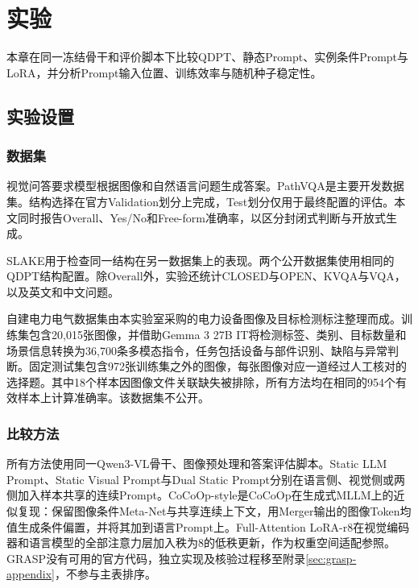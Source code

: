 \section{实验}

本章在同一冻结骨干和评价脚本下比较QDPT、静态Prompt、实例条件Prompt与LoRA，并分析Prompt输入位置、训练效率与随机种子稳定性。

\subsection{实验设置}

\subsubsection{数据集}

视觉问答要求模型根据图像和自然语言问题生成答案\cite{Agrawal2015VQAVQ}。PathVQA\cite{He2020PathVQA3Q}是主要开发数据集。结构选择在官方Validation划分上完成，Test划分仅用于最终配置的评估。本文同时报告Overall、Yes/No和Free-form准确率，以区分封闭式判断与开放式生成。

SLAKE\cite{Liu2021SlakeAS}用于检查同一结构在另一数据集上的表现。两个公开数据集使用相同的QDPT结构配置。除Overall外，实验还统计CLOSED与OPEN、KVQA与VQA，以及英文和中文问题。

自建电力电气数据集由本实验室采购的电力设备图像及目标检测标注整理而成。训练集包含20,015张图像，并借助Gemma 3 27B IT将检测标签、类别、目标数量和场景信息转换为36,700条多模态指令，任务包括设备与部件识别、缺陷与异常判断。固定测试集包含972张训练集之外的图像，每张图像对应一道经过人工核对的选择题。其中18个样本因图像文件关联缺失被排除，所有方法均在相同的954个有效样本上计算准确率。该数据集不公开。

\subsubsection{比较方法}

所有方法使用同一Qwen3-VL骨干\cite{Bai2025Qwen3VLTR}、图像预处理和答案评估脚本。Static LLM Prompt、Static Visual Prompt与Dual Static Prompt分别在语言侧、视觉侧或两侧加入样本共享的连续Prompt\cite{lester2021power,jia2022visual}。CoCoOp-style是CoCoOp\cite{Zhou2022ConditionalPL}在生成式MLLM上的近似复现：保留图像条件Meta-Net与共享连续上下文，用Merger输出的图像Token均值生成条件偏置，并将其加到语言Prompt上。Full-Attention LoRA-r8\cite{Hu2022LoRA}在视觉编码器和语言模型的全部注意力层加入秩为8的低秩更新，作为权重空间适配参照。GRASP\cite{Sun2026GRASPGR}没有可用的官方代码，独立实现及核验过程移至附录\ref{sec:grasp-appendix}，不参与主表排序。

